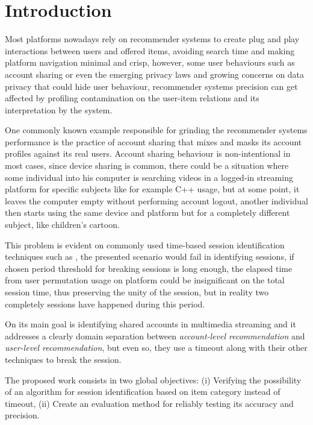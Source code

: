 \documentclass[ecp,tc,english]{iiufrgs}
\begin{document}
\tableofcontents %


\chapter{Introduction}
Most platforms nowadays rely on recommender systems to create plug and play interactions between users and offered items, avoiding search time and making platform navigation minimal and crisp, however, some user behaviours such as account sharing or even the emerging privacy laws and growing concerns on data privacy that could hide user behaviour, recommender systems precision can get affected by profiling contamination on the user-item relations  and its interpretation by the system.

One commonly known example responsible for grinding the recommender systems performance is the practice of account sharing that mixes and masks its account profiles against its real users. Account sharing behaviour is non-intentional in most cases, since device sharing is common, there could be a situation where some individual into his computer is searching videos in a logged-in streaming platform for specific subjects like for example C++ usage, but at some point, it leaves the computer empty without performing account logout, another individual then starts using the same device and platform but for a completely different subject, like children's cartoon.

This problem is evident on commonly used time-based session identification techniques such as \cite{halfaker2015}, the presented scenario would fail in identifying sessions, if chosen period threshold for breaking sessions is long enough, the elapsed time from user permutation usage on platform could be insignificant on the total session time, thus preserving the unity of the session, but in reality two completely sessions have happened during this period.

On \cite{jiang2018} its main goal is identifying shared accounts in multimedia streaming and it addresses a clearly domain separation between \textit{account-level recommendation} and \textit{user-level recommendation}, but even so, they use a timeout along with their other techniques to break the session.

The proposed work consists in two global objectives: (i) Verifying the possibility of an algorithm for session identification based on item category instead of timeout, 
(ii) Create an evaluation method for reliably testing its accuracy and precision.
\end{document}
